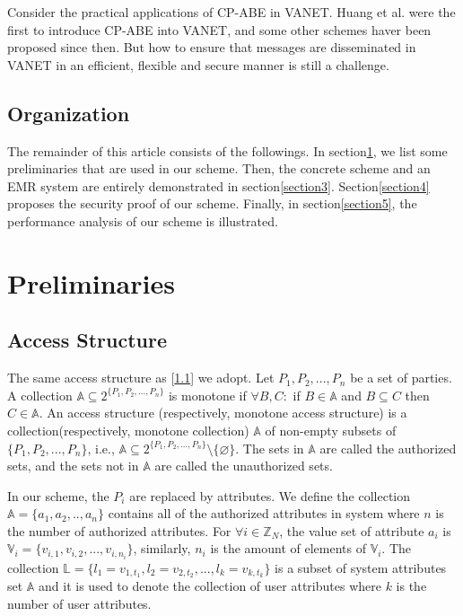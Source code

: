 \documentclass[smallextended]{svjour3}       %
\begin{document}
	Consider the practical applications of CP-ABE in VANET. 
	Huang et al. were the first to introduce CP-ABE into VANET, and some other schemes haver been proposed since then.
	But how to ensure that messages are disseminated in VANET in an efficient, flexible and secure manner is still a challenge.  



\subsection{Organization}
	The remainder of this article consists of the followings. 
	In section\ref{section2}, we list some preliminaries that are used in our scheme. 
	Then, the concrete scheme and an EMR system are entirely demonstrated in section\ref{section3}. 
	Section\ref{section4} proposes the security proof of our scheme. Finally, in section\ref{section5}, the performance analysis of our scheme is illustrated.


\section{Preliminaries}\label{section2}
\subsection{Access Structure}
	The same access structure as [\ref{}] we adopt. 
	Let ${P_1,P_2,...,P_n}$ be a set of parties.
	A collection $\mathbb{A}\subseteq 2^{\{P_1,P_2,...,P_n\}}$ is monotone if $\forall B,C:$ if $B\in \mathbb{A}$ and $B \subseteq C$ then $C \in \mathbb{A}$.
	An access structure (respectively, monotone access structure) is a collection(respectively, monotone collection) $\mathbb{A}$ of non-empty subsets of $\{P_1,P_2,...,P_n\}$, i.e., $\mathbb{A} \subseteq 2^{\{P_1,P_2,...,P_n\}}\setminus\{\varnothing \}$.
	The sets in $\mathbb{A}$ are called the authorized sets, and the sets not in $\mathbb{A}$ are called the unauthorized sets.

	In our scheme, the $P_i$ are replaced by attributes.
	We define the collection $\mathbb{A}=\{a_1,a_2,..,a_n\}$ contains all of the authorized attributes in system where $n$ is the number of authorized attributes. 
	For $\forall i \in \mathbb{Z}_N$, the value set of attribute $a_i$ is $\mathbb{V}_i=\{v_{i,1},v_{i,2},...,v_{i,n_i}\}$, similarly, $n_i$ is the amount of elements of $\mathbb{V}_i$.
	The collection $\mathbb{L}=\{l_1=v_{1,t_1},l_2=v_{2,t_2},...,l_k=v_{k,t_k}\}$ is a subset of system attributes set $\mathbb{A}$ and it is used to denote the collection of user attributes where $k$ is the number of user attributes.  
\end{document}
